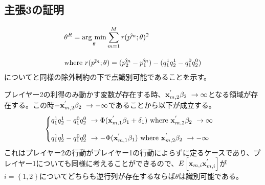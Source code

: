 \documentclass{jsarticle}
\newcommand{\argmin}{\mathop{\rm arg~min}\limits}
\begin{document}

\subsection{主張3の証明}
\begin{align*}
	&\theta^R = \argmin_{\theta} \sum_{m = 1}^M r(\hat{p^m} ; \theta)^2\\[10pt]
	&\text{where}\ r(\hat{p^m} ; \theta) = (\hat{p_2^m} - \hat{p_1^m}) - (q_1^1 q_2^1 - q_1^0 q_2^0)
\end{align*}
について\cite{Tamer2003a}と同様の除外制約の下で点識別可能であることを示す。

プレイヤー2の利得のみ動かす変数が存在する時、${\bf x}_{m, 2}^{'} \beta_2\ \to \infty$となる領域が存在する。この時$-{\bf x}_{m, 2}^{'} \beta_2\ \to -\infty$であることから以下が成立する。
\begin{align*}
\begin{cases}
	q_1^1 q_2^1 - q_1^0 q_2^0\ \to \Phi({\bf x}_{m, 1}^{'} \beta_1 + \delta_1)\ \text{where}\ {\bf x}_{m, 2}^{'} \beta_2\ \to \infty\\[10pt]
	q_1^1 q_2^1 - q_1^0 q_2^0\ \to -\Phi({\bf x}_{m, 1}^{'} \beta_1)\ \text{where}\ {\bf x}_{m, 2}^{'} \beta_2\ \to -\infty
\end{cases}
\end{align*}
これはプレイヤー2の行動がプレイヤー1の行動によらずに定るケースであり、プレイヤー1についても同様に考えることができるので、$E\left[ {\bf x}_{m, i} {\bf x}_{m, i}^{'} \right]$が$i = \left\{ 1,2 \right\}$についてどちらも逆行列が存在するならば$\theta$は識別可能である。
\end{document}
